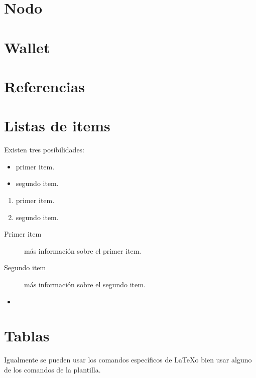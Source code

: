 \section{Nodo}


\section{Wallet}


\section{Referencias}






\section{Listas de items}

Existen tres posibilidades:

\begin{itemize}
	\item primer item.
	\item segundo item.
\end{itemize}

\begin{enumerate}
	\item primer item.
	\item segundo item.
\end{enumerate}

\begin{description}
	\item[Primer item] más información sobre el primer item.
	\item[Segundo item] más información sobre el segundo item.
\end{description}
	
\begin{itemize}
\item 
\end{itemize}

\section{Tablas}

Igualmente se pueden usar los comandos específicos de \LaTeX o bien usar alguno de los comandos de la plantilla.


